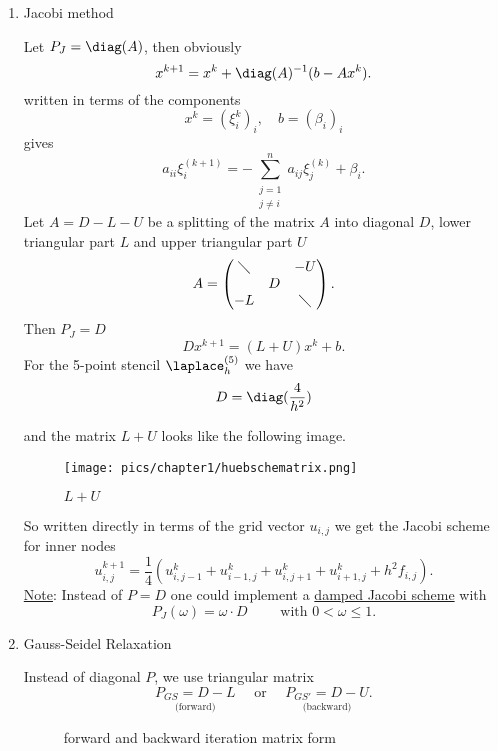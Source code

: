 \begin{enumerate}[label=\Alph{enumi})]
	\item Jacobi method 

		Let $P_{J} = \diag(A)$, then obviously
		\[
			x^{k+1} = x^{k} + \diag(A)^{-1}(b-Ax^{k})
		.\] 
		written in terms of the components
		\[
			x^{k}= (\xi _{i}^{k})_{i}, \quad b=(\beta_{i})_{i}
		\] 
		gives
		\[
			a_{ii}\xi _{i}^{(k+1)} = -\sum_{\substack{j=1 \\ j \neq i}}^{n}{a_{ij}\xi _{j}^{(k)}+ \beta_{i}}
		.\] 
		Let $A=D-L-U$ be a splitting of the matrix $A$ into diagonal $D$, lower triangular part $L$ and upper triangular part $U$
		\[
		A = \begin{pmatrix}
			\diagdown & & -U \\
			  &D&    \\
			-L & & \diagdown
		\end{pmatrix}
		.\] 
		Then $P_{J} = D$
		\[
			Dx^{k+1} = (L+U)x^{k} + b
		.\] 
		For the 5-point stencil $\laplace_{h}^{(5)}$ we have 
		\[
			D = \diag(\frac{4}{h^{2}}) 		
		\] 

		and the matrix $L+U$ looks like the following image.

		\begin{figure}[H]
			\begin{center}
				\texttt{[image: pics/chapter1/huebschematrix.png]}
			\end{center}
			\caption{$L+U$}
			\label{fig:huebschematrix}
		\end{figure}
		
		So written directly in terms of the grid vector $u_{i,j}$ we get the Jacobi scheme for inner nodes
		\[
			u_{i,j}^{k+1} = \frac{1}{4}(u_{i,j-1}^{k}+ u_{i-1,j}^{k} + u_{i,j+1}^{k} + u_{i+1,j}^{k} + h^{2}f_{i,j})
		.\] 
		\underline{Note}: Instead of $P=D$ one could implement a \underline{damped Jacobi scheme} with
		\[
			P_{J}(\omega )=\omega \cdot D \qquad \text{ with } 0 < \omega \leq 1
		.\] 
	\item Gauss-Seidel Relaxation

		Instead of diagonal $P$, we use triangular matrix
		\[
			\underset{\text{ (forward) }}{P_{GS} = D-L} \quad\text{ or }\quad \underset{\text{ (backward) }}{P_{GS'}=D-U}
		.\] 
		\begin{figure}[H]
			\begin{center}
				
			\end{center}
			\caption{forward and backward iteration matrix form}
			\label{fig:forwardbackward}
		\end{figure}
		

\end{enumerate}
